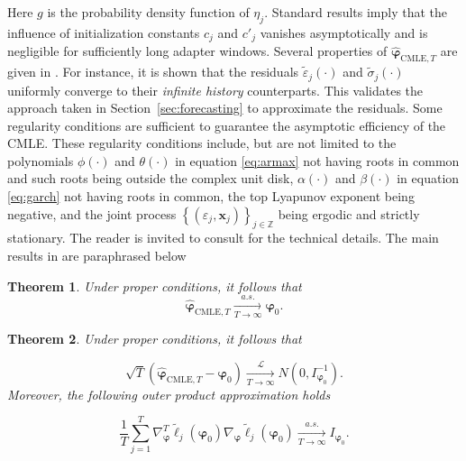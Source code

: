 \documentclass[10pt,a4paper,oneside]{article}
\newcommand{\Z}{\mathbb{Z}}
\newtheorem{theorem}{Theorem}
\begin{document}
Here $g$ is the probability density function of $\eta_j$. Standard results imply that the influence of initialization constants $c_j$ and $c'_j$ vanishes asymptotically and is negligible for sufficiently long adapter windows. Several properties of $\hat{\boldsymbol{\varphi}}_{\mathrm{CMLE}, T}$ are given in \cite{mejia2026asymptotic}. For instance, it is shown that the residuals $\tilde{\varepsilon}_j(\cdot)$ and $\tilde{\sigma}_j(\cdot)$ uniformly converge to their \textit{infinite history} counterparts. This validates the approach taken in Section~\ref{sec:forecasting} to approximate the residuals. Some regularity conditions are sufficient to guarantee the asymptotic efficiency of the CMLE. These regularity conditions include, but are not limited to the polynomials $\phi(\cdot)$ and $\theta(\cdot)$ in equation \eqref{eq:armax} not having roots in common and such roots being outside the complex unit disk, $\alpha(\cdot)$ and $\beta(\cdot)$ in equation \eqref{eq:garch} not having roots in common, the top Lyapunov exponent being negative, and the joint process $\left\{ \left( \varepsilon_j, \mathbf{x}_j \right)  \right\}_{j \in \Z}$ being ergodic and strictly stationary. The reader is invited to consult \cite{mejia2026asymptotic} for the technical details. The main results in \cite{mejia2026asymptotic} are paraphrased below

\begin{theorem}
    Under proper conditions, it follows that
    $$
        \hat{\boldsymbol{\varphi}}_{\mathrm{CMLE}, T} \xrightarrow[T \rightarrow \infty]{a.s.} \boldsymbol{\varphi}_0.
    $$
    \label{thm:consistency}
\end{theorem}

\begin{theorem}
    Under proper conditions, it follows that

    $$
        \sqrt{T} (\hat{\boldsymbol{\varphi}}_{\mathrm{CMLE}, T} - \boldsymbol{\varphi}_0) \xrightarrow[T \rightarrow \infty]{\mathcal{L}} N \left(0, I^{-1}_{\boldsymbol{\varphi}_0} \right).
    $$
    Moreover, the following outer product approximation holds

    $$
        \frac{1}{T} \sum^T_{j = 1} \nabla^T_{\boldsymbol{\varphi}} \tilde{\ell}_j(\boldsymbol{\varphi}_0) \nabla_{\boldsymbol{\varphi}} \tilde{\ell}_j(\boldsymbol{\varphi}_0) \xrightarrow[T \rightarrow \infty]{a.s.} I_{\boldsymbol{\varphi}_0}.
    $$
    \label{thm:asymptotic_normality}
\end{theorem}
\end{document}
